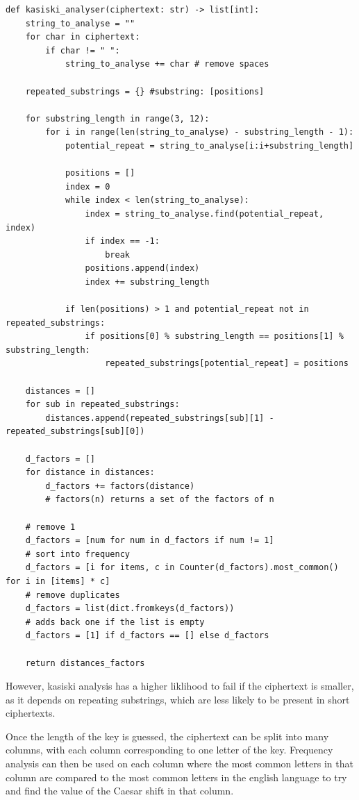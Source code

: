\documentclass{article}
\begin{document}
\begin{lstlisting}
def kasiski_analyser(ciphertext: str) -> list[int]:
    string_to_analyse = ""
    for char in ciphertext:
        if char != " ":
            string_to_analyse += char # remove spaces

    repeated_substrings = {} #substring: [positions]

    for substring_length in range(3, 12):
        for i in range(len(string_to_analyse) - substring_length - 1):
            potential_repeat = string_to_analyse[i:i+substring_length]

            positions = []
            index = 0
            while index < len(string_to_analyse):
                index = string_to_analyse.find(potential_repeat, index)
                if index == -1:
                    break
                positions.append(index)
                index += substring_length

            if len(positions) > 1 and potential_repeat not in repeated_substrings:
                if positions[0] % substring_length == positions[1] % substring_length:
                    repeated_substrings[potential_repeat] = positions

    distances = []
    for sub in repeated_substrings:
        distances.append(repeated_substrings[sub][1] - repeated_substrings[sub][0])

    d_factors = []
    for distance in distances:
        d_factors += factors(distance)
        # factors(n) returns a set of the factors of n

    # remove 1
    d_factors = [num for num in d_factors if num != 1]
    # sort into frequency
    d_factors = [i for items, c in Counter(d_factors).most_common() for i in [items] * c]
    # remove duplicates
    d_factors = list(dict.fromkeys(d_factors))
    # adds back one if the list is empty
    d_factors = [1] if d_factors == [] else d_factors

    return distances_factors
\end{lstlisting}
However, kasiski analysis has a higher liklihood to fail if the ciphertext is 
smaller, as it depends on repeating substrings, which are less likely to be 
present in short ciphertexts.
\medskip

Once the length of the key is guessed, the ciphertext can be split into many
columns, with each column corresponding to one letter of the key. Frequency
analysis can then  be used on each column where the most common letters in that
column are compared to the most common letters in the english language to try
and find the value of the Caesar shift in that column.
\medskip
\end{document}
